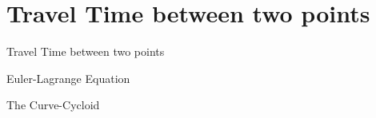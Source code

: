 \documentclass[12pt, a4paper]{article}
\begin{document}
        
        
		
\section{Travel Time between two points}
			
		{Travel Time between two points}
			
			
		{Euler-Lagrange Equation}
        
        
        
        

			
		{The Curve-Cycloid}
        
        
        
        
\end{document}
